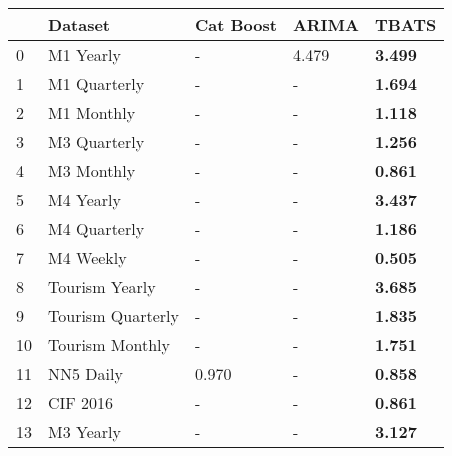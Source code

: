 \begin{tabular}{lllll}
\toprule
 & Dataset & Cat Boost & ARIMA & TBATS \\
\midrule
0 & M1 Yearly & - & 4.479 & \textbf{3.499} \\
1 & M1 Quarterly & - & - & \textbf{1.694} \\
2 & M1 Monthly & - & - & \textbf{1.118} \\
3 & M3 Quarterly & - & - & \textbf{1.256} \\
4 & M3 Monthly & - & - & \textbf{0.861} \\
5 & M4 Yearly & - & - & \textbf{3.437} \\
6 & M4 Quarterly & - & - & \textbf{1.186} \\
7 & M4 Weekly & - & - & \textbf{0.505} \\
8 & Tourism Yearly & - & - & \textbf{3.685} \\
9 & Tourism Quarterly & - & - & \textbf{1.835} \\
10 & Tourism Monthly & - & - & \textbf{1.751} \\
11 & NN5 Daily & 0.970 & - & \textbf{0.858} \\
12 & CIF 2016 & - & - & \textbf{0.861} \\
13 & M3 Yearly & - & - & \textbf{3.127} \\
\bottomrule
\end{tabular}
